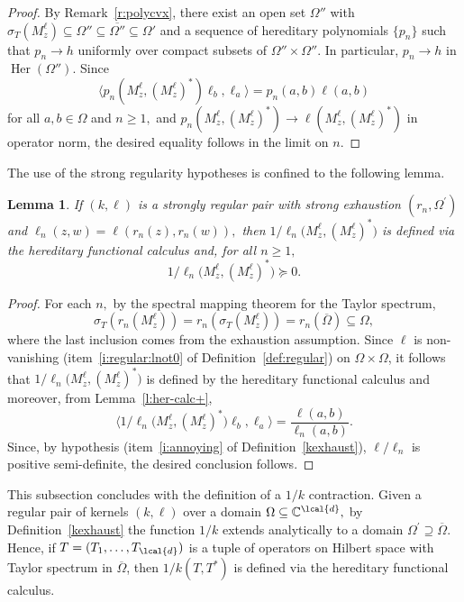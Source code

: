 \documentclass[a4paper,reqno,index]{amsart}
\numberwithin{equation}{section}
\newtheorem{lemma}[theorem]{Lemma}
\newcommand{\CC}{\mathbb{C}}
\newcommand{\specT}{\sigma_T}  %
\newcommand{\ol}[1]{\overline{#1}}
\newcommand{\Her}{\operatorname{Her}}
\theoremstyle{definition}
\begin{document}
\begin{proof}
By  Remark~\ref{r:polycvx},  there exist 
an open set $\Omega''$ with $\specT(M^\ell_z)\subseteq \Omega''\subseteq \overline{\Omega''}\subseteq \Omega'$ and  a sequence of hereditary polynomials $\{p_n\}$ such that $p_n\to h$ uniformly over compact subsets of $\Omega''\times \Omega''$. In particular, $p_n\to h$ in $\Her(\Omega'').$ Since
\begin{equation*} %
 \langle p_n(M^{\ell}_z, (M^\ell_z)^*) \ell_b,\ell_a \rangle = p_n(a,b)\ell(a, b)
\end{equation*}
for all $a, b\in\Omega$ and $n\ge 1,$ and $ p_n(M^{\ell}_z, (M^\ell_z)^*)\to \ell(M^{\ell}_z, (M^\ell_z)^*)  $ in operator norm, the desired equality follows in the limit on $n.$
\end{proof}



The use of the strong regularity hypotheses is confined to the
following lemma.
    
\begin{lemma} \label{approx1-ell}
  If $(k,\ell)$ is a strongly regular pair with strong exhaustion
  $(r_n,\Omega^\prime)$ and $\ell_n(z,w)=\ell(r_n(z),r_n(w)),$ 
  then $1/\ell_n\big(M_z^\ell,(M_z^\ell)^*\big)$ is defined via
  the hereditary functional calculus and, for all $n\ge 1,$
    \[
     1/\ell_n\big(M_z^\ell,(M_z^\ell)^*\big)  \succeq 0.
    \]
\end{lemma}

\begin{proof}
 For each $n,$ by the spectral mapping theorem for the Taylor spectrum, 
\[
 \specT(r_n(M_z^\ell)) = r_n(\specT(M_z^\ell))
  = r_n(\ol{\Omega}) \subseteq \Omega,
\]
 where the last inclusion comes from the exhaustion assumption.
 Since $\ell$ is non-vanishing (item~\ref{i:regular:lnot0} of
 Definition~\ref{def:regular}) on $\Omega\times\Omega$, it
 follows that $1/\ell_n\big(M_z^\ell,(M_z^\ell)^*\big)$
 is defined by the hereditary functional calculus and moreover, 
 from Lemma~\ref{l:her-calc+}, 
\[
 \big\langle 1/\ell_n\big(M_z^\ell,(M_z^\ell)^*\big)\ell_b, \ell_a\big\rangle = \frac{\ell(a,b)}{\ell_n(a,b)}.
\]
Since, by hypothesis (item~\ref{i:annoying} of Definition~\ref{kexhaust}), $\ell/\ell_n$ is positive semi-definite, the desired conclusion follows. 
\end{proof}



   This subsection concludes with the definition of a $1/k$ contraction.
   Given a regular pair of kernels $(k,\ell)$ over a domain $\Omega\subseteq \CC^{\lcal{d}},$
   by Definition~\ref{kexhaust} the function $1/k$ extends analytically to a domain $\Omega^\prime\supseteq \ol{\Omega}.$
   Hence, if $T=(T_1,\dots,T_{\lcal{d}})$ is a tuple of operators on Hilbert space with Taylor spectrum in $\overline{\Omega}$, then $1/k(T,T^*)$ is defined
   via the hereditary functional calculus. 
\end{document}

